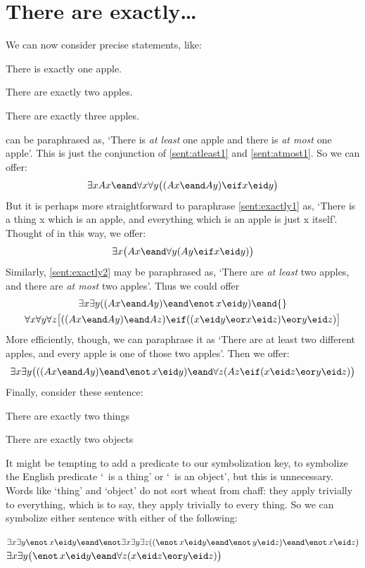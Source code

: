 \section{There are exactly\ldots}
We can now consider precise statements, like:
\begin{samplesent}
\item\label{sent:exactly1} There is exactly one apple.
\item\label{sent:exactly2} There are exactly two apples.
\item\label{sent:exactly3} There are exactly three apples.
\end{samplesent}
 can be paraphrased as, `There is \emph{at least} one apple and there is \emph{at most} one apple'. This is just the conjunction of \cref{sent:atleast1} and \cref{sent:atmost1}. So we can offer:
$$\exists x Ax \eand \forall x\forall y\bigl((Ax \eand Ay) \eif x\eid y\bigr)$$
But it is perhaps more straightforward to paraphrase \cref{sent:exactly1} as, `There is a thing x which is an apple, and everything which is an apple is just x itself'. Thought of in this way, we offer:
$$\exists x\bigl(Ax \eand \forall y(Ay \eif x\eid  y)\bigr)$$
Similarly, \cref{sent:exactly2} may be paraphrased as, `There are \emph{at least} two apples, and there are \emph{at most} two apples'. Thus we could offer
\begin{multline*}
  \exists x \exists y((Ax \eand Ay) \eand \enot\, x\eid y) \eand {}\\
  \forall x\forall y\forall z\bigl[((Ax \eand Ay) \eand Az) \eif ((x\eid y \eor x\eid z) \eor y\eid z)\bigr]
\end{multline*}
More efficiently, though, we can paraphrase it as `There are at least two different apples, and every apple is one of those two apples'. Then we offer:
$$\exists x\exists y\bigl(((Ax \eand Ay) \eand \enot\, x\eid y) \eand \forall z(Az \eif ( x\eid  z \eor y \eid z)\bigr)$$
Finally, consider these sentence:
\begin{samplesent}
\item\label{sent:exactly2things} There are exactly two things
\item\label{sent:exactly2objects} There are exactly two objects
\end{samplesent}
It might be tempting to add a predicate to our symbolization key, to symbolize the English predicate `\blank\ is a thing' or `\blank\ is an object', but this is unnecessary. Words like `thing' and `object' do not sort wheat from chaff: they apply trivially to everything, which is to say, they apply trivially to every thing. So we can symbolize either sentence with either of the following:
	\begin{center}
		$\exists x \exists y \enot\, x\eid y \eand \enot \exists x \exists y \exists z ((\enot\, x\eid y \eand \enot\, y\eid z) \eand \enot\, x\eid z)$\\

		$\exists x \exists y \bigl(\enot\, x\eid y \eand \forall z(x\eid z \eor y \eid z)\bigr)$
	\end{center}

